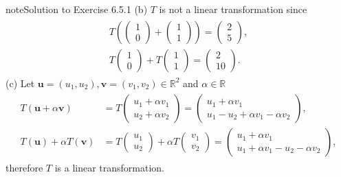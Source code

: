 \documentclass[letterpaper,10pt,english]{jupyterBook}
\begin{document}
\begin{sphinxadmonition}{note}{Solution to Exercise 6.5.1}
\sphinxAtStartPar
(b) \(T\) is not a linear transformation since
\begin{equation*}
\begin{split} \begin{align*}
    T\left( \begin{pmatrix} 1 \\ 0 \end{pmatrix} + \begin{pmatrix} 1 \\ 1 \end{pmatrix} \right) = \begin{pmatrix} 2 \\ 5 \end{pmatrix}, \\
    T\begin{pmatrix} 1 \\ 0 \end{pmatrix} + T\begin{pmatrix} 1 \\ 1 \end{pmatrix} = \begin{pmatrix} 2 \\ 10 \end{pmatrix}.
\end{align*} \end{split}
\end{equation*}
\sphinxAtStartPar
(c) Let \(\mathbf{u} = (u_1, u_2), \mathbf{v} = (v_1, v_2) \in \mathbb{R}^2\) and \(\alpha \in \mathbb{R}\)
\begin{equation*}
\begin{split} \begin{align*}
    T(\mathbf{u} + \alpha \mathbf{v})
    &= T\begin{pmatrix} u_1 + \alpha v_1 \\ u_2 + \alpha v_2 \end{pmatrix}
    = \begin{pmatrix} u_1 + \alpha v_1 \\ u_1 - u_2 + \alpha v_1 - \alpha v_2 \end{pmatrix}, \\
    T(\mathbf{u}) + \alpha T(\mathbf{v})
    &= T\begin{pmatrix} u_1 \\ u_2 \end{pmatrix} + \alpha T\begin{pmatrix} v_1 \\ v_2 \end{pmatrix}
    = \begin{pmatrix} u_1 + \alpha v_1 \\ u_1 + \alpha v_1 - u_2 - \alpha v_2\end{pmatrix},
\end{align*} \end{split}
\end{equation*}
\sphinxAtStartPar
therefore \(T\) is a linear transformation.


\end{sphinxadmonition}
\end{document}
